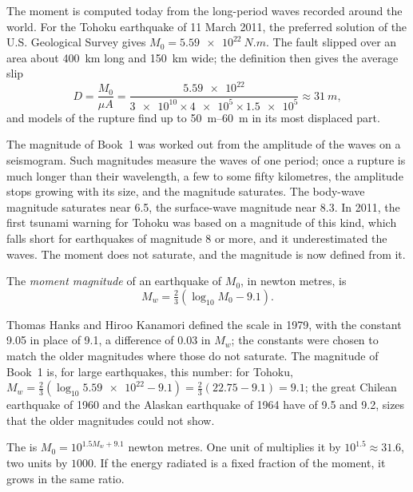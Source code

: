 The moment is computed today from the long-period waves recorded around the
world. For the Tohoku earthquake of 11 March 2011, the preferred solution of
the U.S. Geological Survey gives $M_0 = \qty{5.59e22}{N.m}$. The fault slipped
over an area about \qty{400}{km} long and \qty{150}{km} wide; the definition
then gives the average slip
\[
  D = \frac{M_0}{\mu A}
    = \frac{\num{5.59e22}}{\num{3e10}\times\num{4e5}\times\num{1.5e5}}
    \approx \qty{31}{m} ,
\]
and models of the rupture find up to \qtyrange{50}{60}{m} in its most
displaced part.

The magnitude of Book~1 was worked out from the amplitude of the waves on a
seismogram. Such magnitudes measure the waves of one period; once a rupture is
much longer than their wavelength, a few to some fifty kilometres, the
amplitude stops growing with its size, and the magnitude saturates. The
body-wave magnitude saturates near 6.5, the surface-wave magnitude near 8.3.
In 2011, the first tsunami warning for Tohoku was based on a magnitude of this
kind, which falls short for earthquakes of magnitude 8 or more, and it
underestimated the waves. The moment does not saturate, and the magnitude is
now defined from it.

\begin{definition}\label{def:b1:earthquake-source:mw}
The \emph{moment magnitude} of an earthquake of
 $M_0$, in newton metres, is
\[
  M_w = \tfrac23\left(\log_{10} M_0 - 9.1\right) .
\]
\end{definition}

Thomas Hanks and Hiroo Kanamori defined the scale in 1979, with the constant
9.05 in place of 9.1, a difference of 0.03 in $M_w$; the constants were chosen
to match the older magnitudes where those do not saturate. The magnitude of
Book~1 is, for large earthquakes, this number: for Tohoku,
$M_w = \tfrac23(\log_{10}\num{5.59e22} - 9.1) = \tfrac23(22.75 - 9.1) = 9.1$;
the great Chilean earthquake of 1960 and the Alaskan earthquake of 1964 have
 of 9.5 and 9.2, sizes that the older magnitudes could not
show.

\begin{proposition}\label{prop:b1:earthquake-source:moment-steps}
The  is $M_0 = 10^{1.5 M_w + 9.1}$ newton metres. One unit of
 multiplies it by $10^{1.5} \approx 31.6$, two units by
$1000$. If the energy radiated is a fixed fraction of the moment, it grows in
the same ratio.
\end{proposition}

